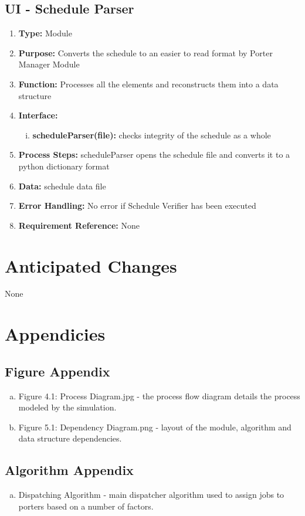 \documentclass[paper=letter, fontsize=10pt]{scrartcl}
\numberwithin{equation}{section}		%
\numberwithin{figure}{section}			%
\numberwithin{table}{section}				%
\begin{document}
\subsection{UI - Schedule Parser}
\begin{enumerate}[]
	\item \textbf{Type:} Module
	\item \textbf{Purpose:} Converts the schedule to an easier to read format by Porter Manager Module
	\item \textbf{Function:} Processes all the elements and reconstructs them into a data structure
	\item \textbf{Interface:} 
	\begin{enumerate}[(i)]
		\item \textbf{scheduleParser(file):} checks integrity of the schedule as a whole
	\end{enumerate}
	\item \textbf{Process Steps:} scheduleParser opens the schedule file and converts it to a python dictionary format
	\item \textbf{Data:} schedule data file
	\item \textbf{Error Handling:} No error if Schedule Verifier has been executed
	\item \textbf{Requirement Reference:} None
\end{enumerate}

\section{Anticipated Changes}
None

\section{Appendicies}
\subsection{Figure Appendix}
\begin{enumerate}[(a)]
	\item Figure 4.1: Process Diagram.jpg - the process flow diagram details the process modeled by the simulation.
	\item Figure 5.1: Dependency Diagram.png - layout of the module, algorithm and data structure dependencies.
\end{enumerate}
\subsection{Algorithm Appendix}
\begin{enumerate}[(a)]
	\item Dispatching Algorithm - main dispatcher algorithm used to assign jobs to porters based on a number of factors.
\end{enumerate}

\end{document}
